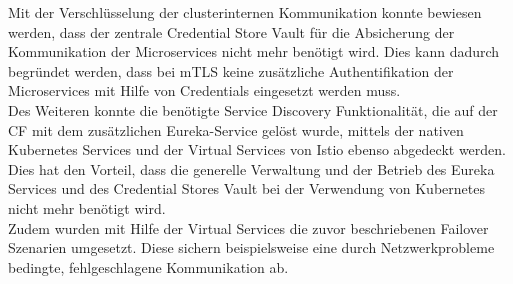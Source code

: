 Mit der Verschlüsselung der clusterinternen Kommunikation konnte bewiesen werden, dass der zentrale Credential Store Vault für die Absicherung der Kommunikation der Microservices nicht mehr benötigt wird. Dies kann dadurch begründet werden, dass bei \ac{mTLS} keine zusätzliche Authentifikation der Microservices mit Hilfe von Credentials eingesetzt werden muss.\\
Des Weiteren konnte die benötigte Service Discovery Funktionalität, die auf der \ac{CF} mit dem zusätzlichen Eureka-Service gelöst wurde, mittels der nativen Kubernetes Services und der Virtual Services von Istio ebenso abgedeckt werden. Dies hat den Vorteil, dass die generelle Verwaltung und der Betrieb des Eureka Services und des Credential Stores Vault bei der Verwendung von Kubernetes nicht mehr benötigt wird.\\
Zudem wurden mit Hilfe der Virtual Services die zuvor beschriebenen Failover Szenarien umgesetzt. Diese sichern beispielsweise eine durch Netzwerkprobleme bedingte, fehlgeschlagene Kommunikation ab.

